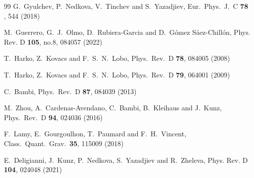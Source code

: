 \documentclass{article}
\begin{document}
\begin{small}
\begin{thebibliography}{99}
  G.~Gyulchev, P.~Nedkova, V.~Tinchev and S.~Yazadjiev,
  Eur.\ Phys.\ J.\ C {\bf 78} ,  544 (2018)

M.~Guerrero, G.~J.~Olmo, D.~Rubiera-Garcia and D.~G\'omez S\'aez-Chill\'on,
Phys. Rev. D \textbf{105}, no.8, 084057 (2022)

  T.~Harko, Z.~Kovacs and F.~S.~N.~Lobo,
  Phys.\ Rev.\ D {\bf 78}, 084005 (2008)

  T.~Harko, Z.~Kovacs and F.~S.~N.~Lobo,
  Phys.\ Rev.\ D {\bf 79}, 064001 (2009)

  C.~Bambi,
  Phys.\ Rev.\ D {\bf 87}, 084039 (2013)

  M.~Zhou, A.~Cardenas-Avendano, C.~Bambi, B.~Kleihaus and J.~Kunz,
  Phys.\ Rev.\ D {\bf 94}, 024036 (2016)

  F.~Lamy, E.~Gourgoulhon, T.~Paumard and F.~H.~Vincent,
  Class.\ Quant.\ Grav.\  {\bf 35},   115009 (2018)

E.~Deligianni, J.~Kunz, P.~Nedkova, S.~Yazadjiev and R.~Zheleva,
Phys. Rev. D \textbf{104},  024048 (2021)


\end{thebibliography}
\end{small}
\end{document}
